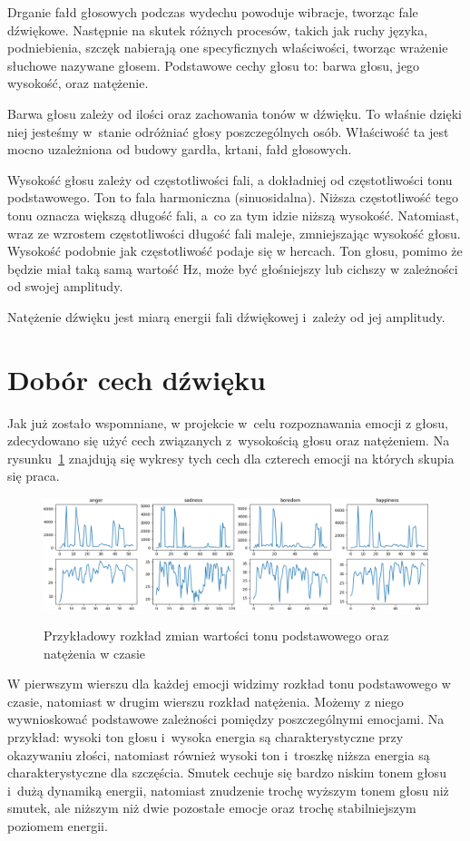 \documentclass[declaration,shortabstract]{iithesis}
\begin{document}
Drganie fałd głosowych podczas wydechu powoduje wibracje, tworząc fale dźwiękowe. Następnie na skutek różnych procesów, takich jak ruchy języka, podniebienia, szczęk nabierają one specyficznych właściwości, tworząc wrażenie słuchowe nazywane głosem. Podstawowe cechy głosu to: barwa głosu, jego wysokość, oraz natężenie.

Barwa głosu zależy od ilości oraz zachowania tonów w dźwięku. To właśnie dzięki niej jesteśmy w~stanie odróżniać głosy poszczególnych osób. Właściwość ta jest mocno uzależniona od budowy gardła, krtani, fałd głosowych. 

Wysokość głosu zależy od częstotliwości fali, a dokładniej od częstotliwości tonu podstawowego. Ton to fala harmoniczna (sinuosidalna). Niższa częstotliwość tego tonu oznacza większą długość fali, a~co za tym idzie niższą wysokość. Natomiast, wraz ze wzrostem częstotliwości długość fali maleje, zmniejszając wysokość głosu. Wysokość podobnie jak częstotliwość podaje się w hercach. Ton głosu, pomimo że będzie miał taką samą wartość Hz, może być głośniejszy lub cichszy w zależności od swojej amplitudy. 

Natężenie dźwięku jest miarą energii fali dźwiękowej i~zależy od jej amplitudy.

\section{Dobór cech dźwięku}
Jak już zostało wspomniane, w projekcie w~celu rozpoznawania emocji z głosu, zdecydowano się użyć cech związanych z~wysokością głosu oraz natężeniem. Na rysunku~\ref{wyk_emo} znajdują się wykresy tych cech dla czterech emocji na których skupia się praca.

\begin{figure}[!h]
\caption{Przykładowy rozkład zmian wartości tonu podstawowego oraz natężenia w czasie}
	\includegraphics[scale=0.3]{b01.png}
\label{wyk_emo}
\end{figure}
	
W pierwszym wierszu dla każdej emocji widzimy rozkład tonu podstawowego w czasie, natomiast w drugim wierszu rozkład natężenia. Możemy z niego wywnioskować podstawowe zależności pomiędzy poszczególnymi emocjami. Na przykład: wysoki ton głosu i~wysoka energia są charakterystyczne  przy okazywaniu złości, natomiast również wysoki ton i~troszkę niższa energia są charakterystyczne dla szczęścia. Smutek cechuje się bardzo niskim tonem głosu i~dużą dynamiką energii, natomiast znudzenie trochę wyższym tonem głosu niż smutek, ale niższym niż dwie pozostałe emocje oraz trochę stabilniejszym poziomem energii. 
\end{document}
